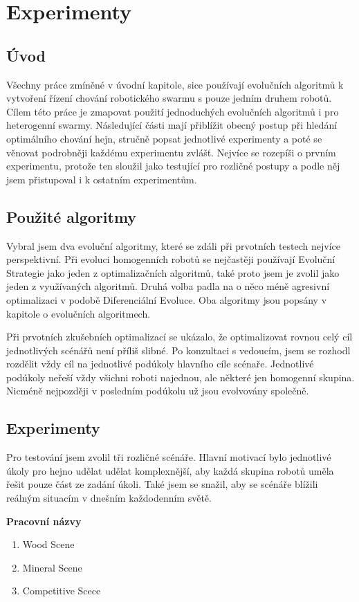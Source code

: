 \chapter{Experimenty}
\section{Úvod}
Všechny práce zmíněné v úvodní kapitole, sice používají evolučních algoritmů k vytvoření řízení chování robotického swarmu s pouze jedním druhem robotů. Cílem této práce je zmapovat použití jednoduchých evolučních algoritmů i pro heterogenní swarmy. Následující části mají přiblížit obecný postup při hledání optimálního chování hejn, stručně popsat jednotlivé experimenty a poté se věnovat podrobněji každému experimentu zvlášť. Nejvíce se rozepíši o prvním experimentu, protože ten sloužil jako testující pro rozličné postupy a podle něj jsem přistupoval i k ostatním experimentům.  
\section{Použité algoritmy}
Vybral jsem dva evoluční algoritmy, které se zdáli při prvotních testech nejvíce perspektivní. Při evoluci homogenních robotů se nejčastěji používají Evoluční Strategie jako jeden z optimalizačních algoritmů, také proto jsem je zvolil jako jeden z využívaných algoritmů. Druhá volba padla na o něco méně agresivní optimalizaci v podobě Diferenciální Evoluce. Oba algoritmy jsou popsány v kapitole o evolučních algoritmech. \par 
Při prvotních zkušebních optimalizací se ukázalo, že optimalizovat rovnou celý cíl jednotlivých scénářů není příliš slibné. Po konzultaci s vedoucím, jsem se rozhodl rozdělit vždy cíl na jednotlivé podúkoly hlavního cíle scénaře. Jednotlivé podúkoly neřeší vždy všichni roboti najednou, ale některé jen homogenní skupina. Nicméně nejpozději v posledním podúkolu už jsou evolvovány společně. 
\section{Experimenty}
Pro testování jsem zvolil tři rozličné scénáře. Hlavní motivací bylo jednotlivé úkoly pro hejno udělat udělat komplexnější, aby každá skupina robotů uměla řešit pouze část ze zadání úkoli. Také jsem se snažil, aby se scénáře blížili reálným situacím v dnešním každodenním světě.\par 
\textbf{Pracovní názvy}
\begin{enumerate}
    \item Wood Scene
    \item Mineral Scene
    \item Competitive Scece
\end{enumerate}


